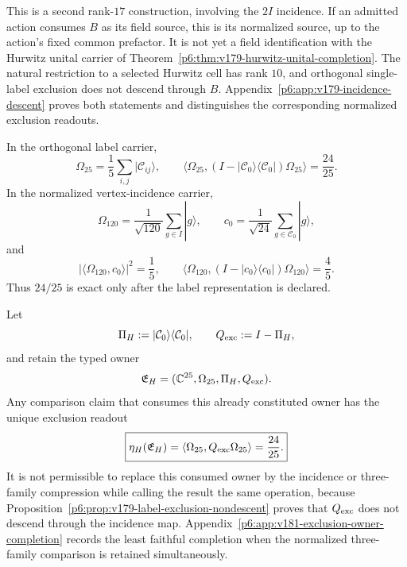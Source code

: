 \documentclass[12pt,a4paper]{article}
\begin{document}
This is a second rank-\(17\) construction, involving the \(2I\) incidence.
If an admitted action consumes \(B\) as its field source, this is its
normalized source, up to the action's fixed common prefactor.
It is not yet a field identification with the Hurwitz unital carrier of
Theorem~\ref{p6:thm:v179-hurwitz-unital-completion}.
The natural restriction to a selected Hurwitz cell has rank \(10\), and
orthogonal single-label exclusion does not descend through \(B\).
Appendix~\ref{p6:app:v179-incidence-descent} proves both statements and
distinguishes the corresponding normalized exclusion readouts.



\begin{corollary}
\label{p6:cor:self-exclusion}
In the orthogonal label carrier,
\[
\Omega_{25}=\frac15\sum_{i,j}|\mathcal C_{ij}\rangle,
\qquad
\langle\Omega_{25},
(I-|\mathcal C_0\rangle\langle\mathcal C_0|)
\Omega_{25}\rangle=\frac{24}{25}.
\]
In the normalized vertex-incidence carrier,
\[
\Omega_{120}=\frac1{\sqrt{120}}\sum_{g\in I}|g\rangle,
\qquad
c_0=\frac1{\sqrt{24}}\sum_{g\in\mathcal C_0}|g\rangle,
\]
and
\[
|\langle\Omega_{120},c_0\rangle|^2=\frac15,
\qquad
\langle\Omega_{120},(I-|c_0\rangle\langle c_0|)
\Omega_{120}\rangle=\frac45.
\]
Thus \(24/25\) is exact only after the label representation is declared.
\end{corollary}


\begin{theorem}
\label{p6:thm:v181-claim-complete-self-exclusion-owner}
Let
\[
 \Pi_H:=|\mathcal C_0\rangle\langle\mathcal C_0|,
 \qquad Q_{\rm exc}:=I-\Pi_H,
\]
and retain the typed owner
\[
 \mathfrak E_H=(\mathbb C^{25},\Omega_{25},\Pi_H,Q_{\rm exc}).
\]
Any comparison claim that consumes this already constituted owner has the
unique exclusion readout
\[
 \boxed{\eta_H(\mathfrak E_H)
 =\langle\Omega_{25},Q_{\rm exc}\Omega_{25}\rangle=\frac{24}{25}.}
\]
It is not permissible to replace this consumed owner by the incidence or
three-family compression while calling the result the same operation,
because Proposition~\ref{p6:prop:v179-label-exclusion-nondescent} proves that
$Q_{\rm exc}$ does not descend through the incidence map.  Appendix~\ref{p6:app:v181-exclusion-owner-completion}
records the least faithful completion when the normalized three-family
comparison is retained simultaneously.
\end{theorem}
\end{document}
